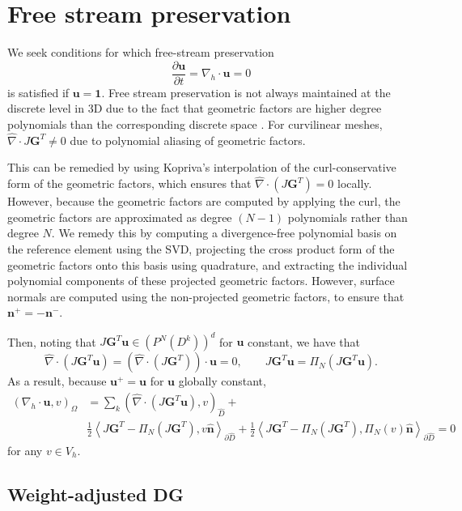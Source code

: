 \documentclass[preprint,10pt]{article}
\theoremstyle{definition}
\theoremstyle{lemma}
\theoremstyle{theorem}
\theoremstyle{assumption}
\renewcommand{\hat}{\widehat}
\newcommand{\pd}[2]{\frac{\partial#1}{\partial#2}}
\newcommand{\LRp}[1]{\left( #1 \right)}
\newcommand{\LRa}[1]{\left\langle #1 \right\rangle}
\newcommand{\Grad} {\ensuremath{\nabla}}
\renewcommand{\d}{\partial}
\begin{document}
\section{Free stream preservation}

We seek conditions for which free-stream preservation 
\[
\pd{\bm{u}}{t} = \Grad_h \cdot \bm{u} = 0
\]
is satisfied if $\bm{u} = \bm{1}$.  Free stream preservation is not always maintained at the discrete level in 3D due to the fact that geometric factors are higher degree polynomials than the corresponding discrete space \cite{kopriva2006metric, johnen2013geometrical}.  For curvilinear meshes, $\hat{\Grad}\cdot{J\bm{G}^T} \neq 0$ due to polynomial aliasing of geometric factors.  

This can be remedied by using Kopriva's interpolation of the curl-conservative form of the geometric factors, which ensures that $\hat{\Grad}\cdot\LRp{J\bm{G}^T} = 0$ locally.  However, because the geometric factors are computed by applying the curl, the geometric factors are approximated as degree $(N-1)$ polynomials rather than degree $N$.  We remedy this by computing a divergence-free polynomial basis on the reference element using the SVD, projecting the cross product form of the geometric factors onto this basis using quadrature, and extracting the individual polynomial components of these projected geometric factors.  However, surface normals are computed using the non-projected geometric factors, to ensure that $\bm{n}^+ = -\bm{n}^-$.  

Then, noting that $J\bm{G}^T\bm{u} \in \LRp{P^N\LRp{D^k}}^d$ for $\bm{u}$ constant, we have that
\[
\hat{\Grad}\cdot \LRp{J\bm{G}^T\bm{u}} = \LRp{\hat{\Grad}\cdot \LRp{J\bm{G}^T}}\cdot\bm{u} = 0, \qquad J\bm{G}^T\bm{u} = \Pi_N\LRp{J\bm{G}^T\bm{u}}.
\]
As a result, because $\bm{u}^+ = \bm{u}$ for $\bm{u}$ globally constant,
\begin{align*}
\LRp{\Grad_h \cdot \bm{u},v}_{\Omega} &= \sum_k \LRp{\hat{\Grad} \cdot \LRp{J\bm{G}^T\bm{u}},v }_{\hat{D}} + \\
&\frac{1}{2}\LRa{J\bm{G}^T - \Pi_N \LRp{J\bm{G}^T}, v \hat{\bm{n}}}_{\d \hat{D}} + \frac{1}{2}\LRa{J\bm{G}^T - \Pi_N \LRp{J\bm{G}^T}, \Pi_N\LRp{v}\hat{\bm{n}}}_{\d \hat{D}} = 0
\end{align*}
for any $v\in V_h$.  





\subsection{Weight-adjusted DG}
\end{document}
